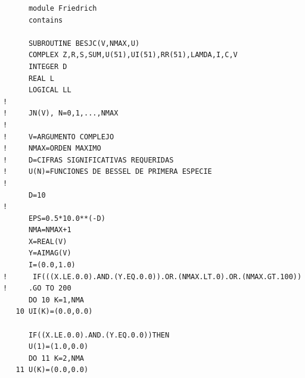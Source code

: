 \documentclass [11pt,spanish]{article}
\begin{document}
\begingroup
\fontsize{10pt}{12pt}
\selectfont
{}
\begin{shaded}
\begin{verbatim}
      module Friedrich
      contains
      
      SUBROUTINE BESJC(V,NMAX,U)
      COMPLEX Z,R,S,SUM,U(51),UI(51),RR(51),LAMDA,I,C,V
      INTEGER D
      REAL L
      LOGICAL LL
!
!     JN(V), N=0,1,...,NMAX
!
!     V=ARGUMENTO COMPLEJO
!     NMAX=ORDEN MAXIMO
!     D=CIFRAS SIGNIFICATIVAS REQUERIDAS
!     U(N)=FUNCIONES DE BESSEL DE PRIMERA ESPECIE
!
      D=10
!
      EPS=0.5*10.0**(-D)
      NMA=NMAX+1
      X=REAL(V)
      Y=AIMAG(V)
      I=(0.0,1.0)
!      IF(((X.LE.0.0).AND.(Y.EQ.0.0)).OR.(NMAX.LT.0).OR.(NMAX.GT.100))
!     .GO TO 200
      DO 10 K=1,NMA
   10 UI(K)=(0.0,0.0)

      IF((X.LE.0.0).AND.(Y.EQ.0.0))THEN
	  U(1)=(1.0,0.0)
      DO 11 K=2,NMA
   11 U(K)=(0.0,0.0)


\end{verbatim}
\end{shaded}
\end{document}
